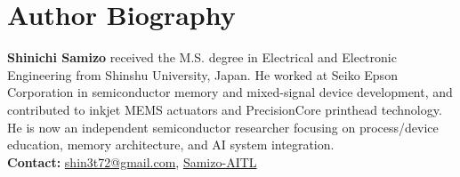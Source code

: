 \documentclass[conference]{IEEEtran}
\begin{document}
\section*{Author Biography}
\noindent\textbf{Shinichi Samizo}
received the M.S. degree in Electrical and Electronic Engineering from Shinshu University, Japan.
He worked at Seiko Epson Corporation in semiconductor memory and mixed-signal device development, and contributed to inkjet MEMS actuators and PrecisionCore printhead technology.
He is now an independent semiconductor researcher focusing on process/device education, memory architecture, and AI system integration.\\[2pt]
\textbf{Contact:} \href{mailto:shin3t72@gmail.com}{shin3t72@gmail.com},
\href{https://github.com/Samizo-AITL}{Samizo-AITL}

\clearpage
\end{document}
